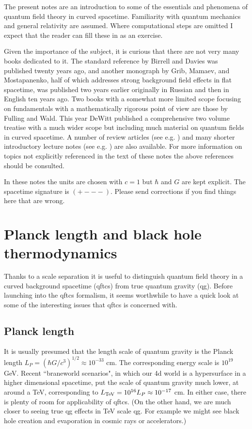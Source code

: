 \documentclass[12pt]{article}
\newcommand{\sect}[1]{\section{#1}\setcounter{equation}{0}}
\begin{document}
The present notes are an introduction
to some of the essentials and phenomena 
of quantum field theory in curved spacetime. Familiarity with 
quantum mechanics and general relativity are assumed.
Where computational steps are omitted I expect that the
reader can fill these in as an exercise. 

Given the importance of the subject, it is curious that
there are not very many books dedicated to it.
The standard reference by Birrell and Davies\cite{BD} was published twenty years 
ago, and another monograph by Grib, Mamaev, and Mostapanenko\cite{Grib}, 
half of which addresses strong background field effects in flat spacetime, 
was published two years earlier originally in Russian and then
in English  ten years ago. Two books with a somewhat more limited scope
focusing on fundamentals with a mathematically rigorous
point of view are those by Fulling\cite{Fulling89} and Wald\cite{Wald94}.
This year DeWitt\cite{brycebook} 
published a comprehensive two volume treatise with a much wider scope
but including much material on quantum fields in curved spacetime.
A number of review articles (see e.g. \cite{DeWitt75,Isham, Gibbons, DeWittEC,
FullRuij, Brout:rd}) 
and many shorter introductory lecture notes (see e.g. \cite{Ford,Wipf,Traschen})
are also available. For more information on topics not explicitly
referenced in the text of these notes the above references should be consulted.

In these notes the units are chosen with $c=1$ but $\hbar$ and $G$ are kept 
explicit. The spacetime signature is $({+}{-}{-}{-})$. Please send
corrections if you find things here that are wrong.

\sect{Planck length and black hole thermodynamics}

Thanks to a scale separation 
it is useful to distinguish quantum field theory 
in a curved background spacetime (qftcs)
from  true quantum gravity (qg).
Before launching into the qftcs formalism, 
it seems worthwhile to have a quick look
at some of the interesting 
issues that qftcs is  concerned with.

\subsection{Planck length}
It is usually presumed that the length scale of quantum gravity is the
Planck length $L_P = (\hbar G/c^3)^{1/2}\approx 10^{-33}$ cm.
The corresponding energy scale is $10^{19}$ GeV.
Recent  ``braneworld scenarios", in which 
our 4d world is a hypersurface in a higher dimensional
spacetime,  put the scale of quantum gravity much
lower, at around a TeV, corresponding to 
$L_{\rm TeV}=10^{16}L_P\approx 10^{-17}$ cm.
In either case, there is plenty of room
for applicability of qftcs. (On the other hand, we are much closer
to seeing true qg effects in TeV scale qg. For example we might
see black hole creation and evaporation in cosmic rays or accelerators.)
\end{document}
